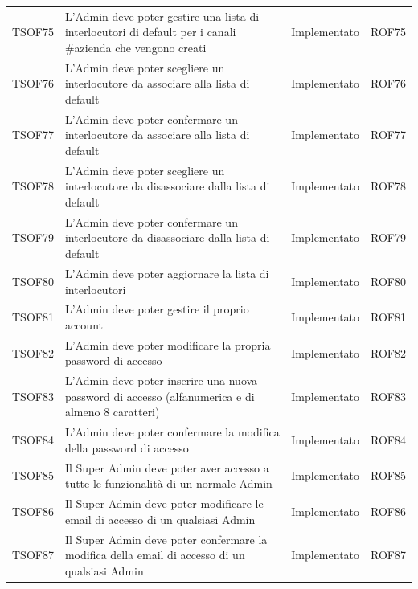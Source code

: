 \documentclass[../PianoDiQualifica_v4.0.0.tex]{subfiles}
\begin{document}
\begin{longtable}[c] { >{\centering\arraybackslash}p{2cm} p{7cm} >{\centering\arraybackslash}p{4cm} >{\centering\arraybackslash}p{2cm}}
			TSOF75 & L'Admin deve poter gestire una lista di interlocutori di default per i canali \#azienda che vengono creati & Implementato & ROF75 \\
			\addlinespace[0.3em]
			\midrule
			\addlinespace[0.3em]
			TSOF76 & L'Admin deve poter scegliere un interlocutore da associare alla lista di default	& Implementato & ROF76 \\
			\addlinespace[0.3em]
			\midrule
			\addlinespace[0.3em]
			TSOF77 & L'Admin deve poter confermare un interlocutore da associare alla lista di default	& Implementato & ROF77 \\
			\addlinespace[0.3em]
			\midrule
			\addlinespace[0.3em]
			TSOF78 & L'Admin deve poter scegliere un interlocutore da disassociare dalla lista di default & Implementato & ROF78 \\
			\addlinespace[0.3em]
			\midrule
			\addlinespace[0.3em]
			TSOF79 & L'Admin deve poter confermare un interlocutore da disassociare dalla lista di default & Implementato & ROF79 \\
			\addlinespace[0.3em]
			\midrule
			\addlinespace[0.3em]
			TSOF80 & L'Admin deve poter aggiornare la lista di interlocutori & Implementato & ROF80 \\
			\addlinespace[0.3em]
			\midrule
			\addlinespace[0.3em]
			TSOF81 & L'Admin deve poter gestire il proprio account & Implementato & ROF81 \\
			\addlinespace[0.3em]
			\midrule
			\addlinespace[0.3em]
			TSOF82 & L'Admin deve poter modificare la propria password di accesso & Implementato & ROF82 \\
			\addlinespace[0.3em]
			\midrule
			\addlinespace[0.3em]
			TSOF83 & L'Admin deve poter inserire una nuova password di accesso (alfanumerica e di almeno 8 caratteri) & Implementato & ROF83 \\
			\addlinespace[0.3em]
			\midrule
			\addlinespace[0.3em]
			TSOF84 & L'Admin deve poter confermare la modifica della password di accesso & Implementato & ROF84 \\
			\addlinespace[0.3em]
			\midrule
			\addlinespace[0.3em]
			TSOF85 & Il Super Admin deve poter aver accesso a tutte le funzionalità di un normale Admin & Implementato & ROF85 \\
			\addlinespace[0.3em]
			\midrule
			\addlinespace[0.3em]
			TSOF86 & Il Super Admin deve poter modificare le email di accesso di un qualsiasi Admin	& Implementato & ROF86 \\
			\addlinespace[0.3em]
			\midrule
			\addlinespace[0.3em]
			TSOF87 & Il Super Admin deve poter confermare la modifica della email di accesso di un qualsiasi Admin & Implementato & ROF87 \\

\end{longtable}
\end{document}
